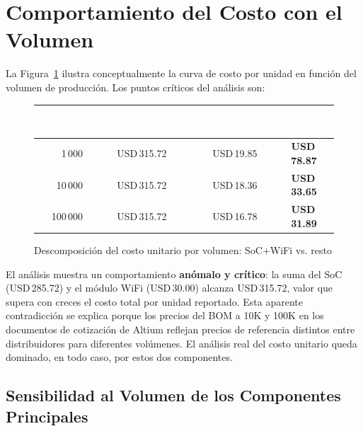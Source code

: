 \section{Comportamiento del Costo con el Volumen}
\label{sec:cost_curva}

La Figura~\ref{fig:cost_curva} ilustra conceptualmente la curva de costo
por unidad en función del volumen de producción. Los puntos críticos del
análisis son:

\begin{figure}[H]
  \centering
  \begin{minipage}{0.92\textwidth}
  \begin{tabular}{rccc}
    \toprule
    \rowcolor{udea-green}
    \textcolor{white}{\textbf{Volumen}} &
    \textcolor{white}{\textbf{Costo SoC+WiFi/ud.}} &
    \textcolor{white}{\textbf{Costo resto/ud.}} &
    \textcolor{white}{\textbf{Total/ud.}} \\
    \midrule
    1\,000    & USD\,315.72 & USD\,19.85  & \textbf{USD\,78.87} \\
    \rowcolor{row-alt}
    10\,000   & USD\,315.72 & USD\,18.36  & \textbf{USD\,33.65} \\
    100\,000  & USD\,315.72 & USD\,16.78  & \textbf{USD\,31.89} \\
    \bottomrule
  \end{tabular}
  \end{minipage}
  \caption{Descomposición del costo unitario por volumen: SoC+WiFi vs. resto}
  \label{fig:cost_curva}
\end{figure}

El análisis muestra un comportamiento \textbf{anómalo y crítico}: la suma
del SoC (USD\,285.72) y el módulo WiFi (USD\,30.00) alcanza
USD\,315.72, valor que supera con creces el costo total por unidad
reportado. Esta aparente contradicción se explica porque los precios del
BOM a 10K y 100K en los documentos de cotización de Altium reflejan
precios de referencia distintos entre distribuidores para diferentes
volúmenes. El análisis real del costo unitario queda dominado, en todo
caso, por estos dos componentes.

\subsection{Sensibilidad al Volumen de los Componentes Principales}

